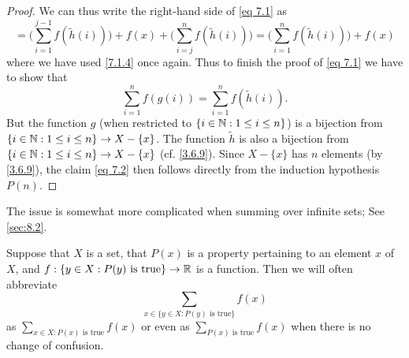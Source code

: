 \begin{proof}
  We can thus write the right-hand side of \eqref{eq 7.1} as
  \[
    = \Bigg(\sum_{i = 1}^{j - 1} f(\tilde{h}(i))\Bigg) + f(x) + \Bigg(\sum_{i = j}^n f(\tilde{h}(i))\Bigg) = \Bigg(\sum_{i = 1}^n f(\tilde{h}(i))\Bigg) + f(x)
  \]
  where we have used \cref{7.1.4} once again.
  Thus to finish the proof of \eqref{eq 7.1} we have to show that
  \[
    \sum_{i = 1}^n f(g(i)) = \sum_{i = 1}^n f(\tilde{h}(i)). \tag{7.2}\label{eq 7.2}
  \]
  But the function \(g\) (when restricted to \(\{i \in \mathbb{N} : 1 \leq i \leq n\}\)) is a bijection from \(\{i \in \mathbb{N} : 1 \leq i \leq n\} \to X - \{x\}\).
  The function \(\tilde{h}\) is also a bijection from \(\{i \in \mathbb{N} : 1 \leq i \leq n\} \to X - \{x\}\) (cf. \cref{3.6.9}).
  Since \(X - \{x\}\) has \(n\) elements (by \cref{3.6.9}), the claim \eqref{eq 7.2} then follows directly from the induction hypothesis \(P(n)\).
\end{proof}

\begin{rmk}\label{7.1.9}
  The issue is somewhat more complicated when summing over infinite sets;
  See \cref{sec:8.2}.
\end{rmk}

\begin{rmk}\label{7.1.10}
  Suppose that \(X\) is a set, that \(P(x)\) is a property pertaining to an element \(x\) of \(X\), and \(f : \{y \in X : P(y) \text{ is true}\} \to \mathbb{R}\) is a function.
  Then we will often abbreviate
  \[
    \sum_{x \in \{y \in X : P(y) \text{ is true}\}} f(x)
  \]
  as \(\sum_{x \in X : P(x) \text{ is true}} f(x)\) or even as \(\sum_{P(x) \text{ is true}} f(x)\) when there is no change of confusion.
\end{rmk}

